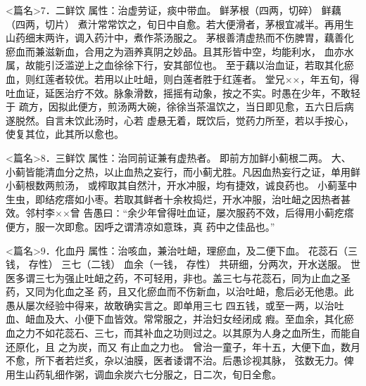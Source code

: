 \documentclass[a4paper,12pt,UTF8,twoside]{ctexbook}
\begin{document}
<篇名>7．二鲜饮
属性：治虚劳证，痰中带血。 
鲜茅根（四两，切碎） 鲜藕（四两，切片） 
煮汁常常饮之，旬日中自愈。若大便滑者，茅根宜减半。再用生山药细末两许，调入药汁中，煮作茶汤服之。 
茅根善清虚热而不伤脾胃，藕善化瘀血而兼滋新血，合用之为涵养真阴之妙品。且其形皆中空，均能利水， 
血亦水属，故能引泛滥逆上之血徐徐下行，安其部位也。 
至于藕以治血证，若取其化瘀血，则红莲者较优。若用以止吐衄，则白莲者胜于红莲者。 
堂兄××，年五旬，得吐血证，延医治疗不效。脉象滑数，摇摇有动象，按之不实。时愚在少年，不敢轻于 
疏方，因拟此便方，煎汤两大碗，徐徐当茶温饮之，当日即见愈，五六日后病遂脱然。自言未饮此汤时，心若 
虚悬无着，既饮后，觉药力所至，若以手按心，使复其位，此其所以愈也。 


<篇名>8．三鲜饮
属性：治同前证兼有虚热者。 
即前方加鲜小蓟根二两。 
大、小蓟皆能清血分之热，以止血热之妄行，而小蓟尤胜。凡因血热妄行之证，单用鲜小蓟根数两煎汤， 
或榨取其自然汁，开水冲服，均有捷效，诚良药也。 
小蓟茎中生虫，即结疙瘩如小枣。若取其鲜者十余枚捣烂，开水冲服，治吐衄之因热者甚效。邻村李××曾 
告愚曰∶“余少年曾得吐血证，屡次服药不效，后得用小蓟疙瘩便方，服一次即愈。因呼之谓清凉如意珠，真 
药中之佳品也。” 


<篇名>9．化血丹
属性：治咳血，兼治吐衄，理瘀血，及二便下血。 
花蕊石（三钱， 存性） 三七（二钱） 血余（一钱， 存性） 
共研细，分两次，开水送服。 
世医多谓三七为强止吐衄之药，不可轻用，非也。盖三七与花蕊石，同为止血之圣药，又同为化血之圣 
药，且又化瘀血而不伤新血，以治吐衄，愈后必无他患。此愚从屡次经验中得来，故敢确实言之。即单用三七 
四五钱，或至一两，以治吐血、衄血及大、小便下血皆效。常常服之，并治妇女经闭成 瘕。至血余，其化瘀 
血之力不如花蕊石、三七，而其补血之功则过之。以其原为人身之血所生，而能自还原化，且 之为炭，而又 
有止血之力也。 
曾治一童子，年十五，大便下血，数月不愈，所下者若烂炙，杂以油膜，医者诿谓不治。后愚诊视其脉， 
弦数无力。俾用生山药轧细作粥，调血余炭六七分服之，日二次，旬日全愈。 
\end{document}
